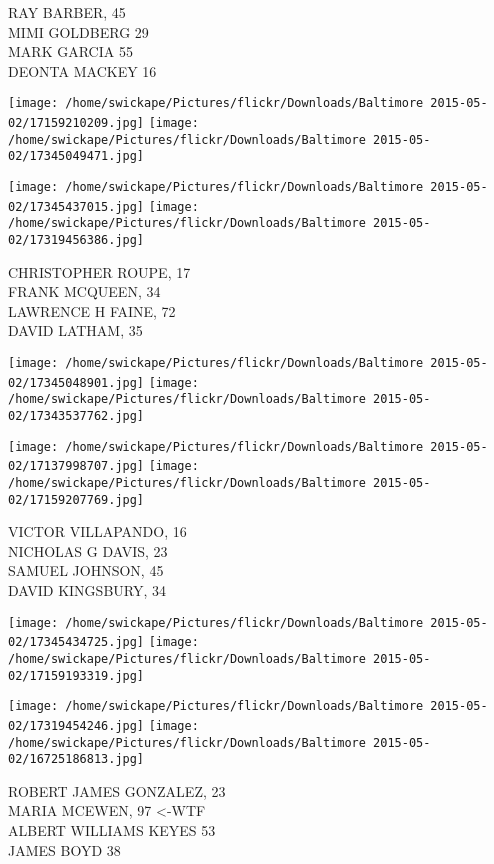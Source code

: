 \documentclass[10pt,letterpaper]{article}
\begin{document}
RAY BARBER, 45\\
MIMI GOLDBERG 29\\
MARK GARCIA 55\\
DEONTA MACKEY 16\\
\pagebreak

\texttt{[image: /home/swickape/Pictures/flickr/Downloads/Baltimore 2015-05-02/17159210209.jpg]}
\texttt{[image: /home/swickape/Pictures/flickr/Downloads/Baltimore 2015-05-02/17345049471.jpg]}

\texttt{[image: /home/swickape/Pictures/flickr/Downloads/Baltimore 2015-05-02/17345437015.jpg]}
\texttt{[image: /home/swickape/Pictures/flickr/Downloads/Baltimore 2015-05-02/17319456386.jpg]}

CHRISTOPHER ROUPE, 17\\
FRANK MCQUEEN, 34\\
LAWRENCE H FAINE, 72\\
DAVID LATHAM, 35\\
\pagebreak

\texttt{[image: /home/swickape/Pictures/flickr/Downloads/Baltimore 2015-05-02/17345048901.jpg]}
\texttt{[image: /home/swickape/Pictures/flickr/Downloads/Baltimore 2015-05-02/17343537762.jpg]}

\texttt{[image: /home/swickape/Pictures/flickr/Downloads/Baltimore 2015-05-02/17137998707.jpg]}
\texttt{[image: /home/swickape/Pictures/flickr/Downloads/Baltimore 2015-05-02/17159207769.jpg]}

VICTOR VILLAPANDO, 16\\
NICHOLAS G DAVIS, 23\\
SAMUEL JOHNSON, 45\\
DAVID KINGSBURY, 34\\
\pagebreak

\texttt{[image: /home/swickape/Pictures/flickr/Downloads/Baltimore 2015-05-02/17345434725.jpg]}
\texttt{[image: /home/swickape/Pictures/flickr/Downloads/Baltimore 2015-05-02/17159193319.jpg]}

\texttt{[image: /home/swickape/Pictures/flickr/Downloads/Baltimore 2015-05-02/17319454246.jpg]}
\texttt{[image: /home/swickape/Pictures/flickr/Downloads/Baltimore 2015-05-02/16725186813.jpg]}

ROBERT JAMES GONZALEZ, 23\\
MARIA MCEWEN, 97 <{-}WTF\\
ALBERT WILLIAMS KEYES 53\\
JAMES BOYD 38\\
\pagebreak
\end{document}
